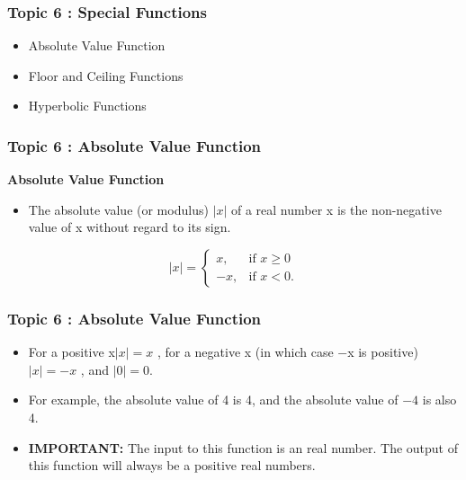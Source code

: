 \documentclass{beamer}
\begin{document}

\begin{frame}
	\frametitle{Topic 6 : Special Functions}
	\Large
	\begin{itemize}
		\item Absolute Value Function
		\item Floor and Ceiling Functions
		\item Hyperbolic Functions
	\end{itemize}	
\end{frame}


\begin{frame}
	\frametitle{Topic 6 : Absolute Value Function}
	\Large
	\textbf{Absolute Value Function}
	\begin{itemize}
	\item The absolute value (or modulus) $|x|$ of a real number x is the non-negative value of x without regard to its sign. 
	
	\end{itemize}
	\[|x| = \begin{cases} x, & \mbox{if }  x \ge 0  \\ -x,  & \mbox{if } x < 0. \end{cases} \]
\end{frame}
\begin{frame}
	\frametitle{Topic 6 : Absolute Value Function}
	\Large
	\vspace{-1cm}
\begin{itemize}

	\item For a positive x$|x| = x$ , for a negative x (in which case −x is positive) $|x| = -x$ , and $|0| = 0$. \smallskip
	\item For example, the absolute value of 4 is 4, and the absolute value of $-4$ is also 4. \smallskip
	\item \textbf{IMPORTANT:}  The input to this function is an real number. The output of this function will always be a positive real numbers.
\end{itemize}


\end{frame}
\end{document}
